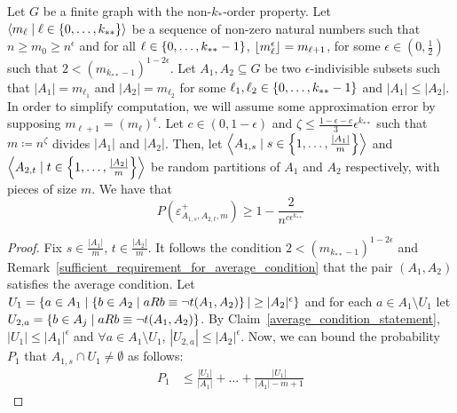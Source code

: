     \begin{lemma}[Claim 4.13] \label{bound_on_the_probability_of_a_subpair_having_no_exceptions}
        Let $G$ be a finite graph with the non-$k_{*}$-order property.
        Let $\left< m_\ell \mid \ell \in \left\{ 0, \dots, k_{**} \right\} \right>$ be a sequence of non-zero natural numbers such that
        $n \geq m_0 \geq n^\epsilon$ and for all $\ell \in \left\{ 0, \dots, k_{**}-1 \right\}$, $\left\lfloor m_\ell^\epsilon \right\rfloor = m_{\ell+1}$,
        for some $\epsilon \in (0, \frac{1}{2})$ such that $2 < (m_{k_{**}-1})^{1-2\epsilon}$.
        Let $A_1, A_2 \subseteq G$ be two $\epsilon$-indivisible subsets such that $|A_1| = m_{\ell_1}$ and $|A_2| = m_{\ell_2}$
        for some $\ell_1, \ell_2 \in \left\{ 0, \dots, k_{**}-1 \right\}$ and $|A_1| \leq |A_2|$.
        In order to simplify computation, we will assume some approximation error by supposing $m_{\ell+1} = (m_{\ell})^\epsilon$.
        Let $c \in (0, 1-\epsilon)$ and $\zeta \leq \frac{1 - \epsilon - c}{3}\epsilon^{k_{**}}$ such that
        $m \coloneqq n^\zeta$ divides $|A_1|$ and $|A_2|$.
        Then, let $\left< A_{1,s} \mid s \in \left\{ 1, \dots, \frac{|A_1|}{m} \right\} \right>$ and
        $\left< A_{2,t} \mid t \in \left\{ 1, \dots, \frac{|A_2|}{m} \right\} \right>$ be random partitions of $A_1$ and $A_2$
        respectively, with pieces of size $m$.
        We have that
        \[
            P(\varepsilon^+_{A_{1,s},A_{2,t},m}) \geq 1 - \frac{2}{n^{c\epsilon^{k_{**}}}}
        \]
        \begin{proof}
            Fix $s \in \frac{|A_1|}{m}$, $t \in \frac{|A_2|}{m}$.
            It follows the condition $2 < (m_{k_{**}-1})^{1-2\epsilon}$ and Remark~\ref{sufficient_requirement_for_average_condition}
            that the pair $(A_{1}, A_{2})$ satisfies the average condition.
            Let $U_1 = \left\{ a \in A_1 \mid \left\{ b \in A_2 \mid a R b \equiv \neg t(A_1, A_2) \right\}| \geq |A_2|^\epsilon \right\}$
            and for each $a \in A_1 \setminus U_1$ let $U_{2,a} = \left\{ b \in A_j \mid a R b \equiv \neg t(A_1, A_2) \right\}$.
            By Claim~\ref{average_condition_statement}, $|U_1| \leq |A_1|^\epsilon$ and $\forall a \in A_1 \setminus U_1$,
            $|U_{2,a}| \leq |A_2|^\epsilon$.
            Now, we can bound the probability $P_1$ that $A_{1,s} \cap U_1 \neq \emptyset$ as follows:
            \[
                \begin{split}
                    P_1
                        & \leq \frac{|U_1|}{|A_1|} + \dots + \frac{|U_1|}{|A_1|-m+1}

\end{split}\]
\end{proof}
\end{lemma}
